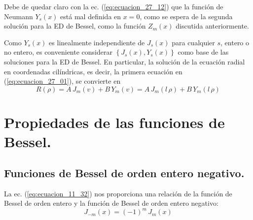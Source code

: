 Debe de quedar claro con la ec. (\ref{eq:ecuacion_27_12}) que la función de Neumann $Y_{s} (x)$ está mal definida en $x = 0$, como se espera de la segunda solución para la ED de Bessel, como la función $Z_{m} (x)$ discutida anteriormente.
\par
Como $Y_{s} (x)$ es linealmente independiente de $J_{s} (x)$ para cualquier $s$, entero o no entero, es conveniente considerar $\left\{ J_{s} (x), Y_{s} (x) \right\}$ como base de las soluciones para la ED de Bessel. En particular, la solución de la ecuación radial en coordenadas cilíndricas, es decir, la primera ecuación en (\ref{eq:ecuacion_27_01}), se convierte en
\begin{equation}
R(\rho) = A \, J_{m}(v) + B \, Y_{m}(v) = A \, J_{m} (l \, \rho) + B \, Y_{m} (l \, \rho)
\label{eq:ecuacion_27_13}
\end{equation}
\section{Propiedades de las funciones de Bessel.}
\subsection{Funciones de Bessel de orden entero negativo.}
La ec. (\ref{eq:ecuacion_11_32}) nos proporciona una relación de la función de Bessel de orden entero y la función de Bessel de orden entero negativo:
\begin{equation}
J_{-m} (x) = (-1)^{m} \, J_{m} (x)
\label{eq:ecuacion_27_14}
\end{equation}
